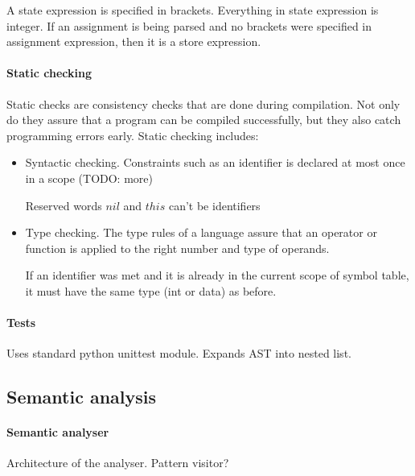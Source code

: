 A state expression is specified in brackets. Everything in state expression is integer.
If an assignment is being parsed and no brackets were specified in assignment expression, then it is a store expression.

  \paragraph{Static checking}
Static checks are consistency checks that are done during compilation. Not only do they assure that a program can be compiled successfully, but they also catch programming errors early. Static checking includes:
\begin{itemize}
\item Syntactic checking. Constraints such as an identifier is declared at most once in a scope (TODO: more)

Reserved words $nil$ and $this$ can't be identifiers

\item Type checking. The type rules of a language assure that an operator or function is applied to the right number and type of operands.

If an identifier was met and it is already in the current scope of symbol table, it must have the same type (int or data) as before.
\end{itemize}

    \paragraph{Tests}
Uses standard python unittest module.
Expands AST into nested list.

\subsection{Semantic analysis}
  \paragraph{Semantic analyser}
Architecture of the analyser. Pattern visitor?

